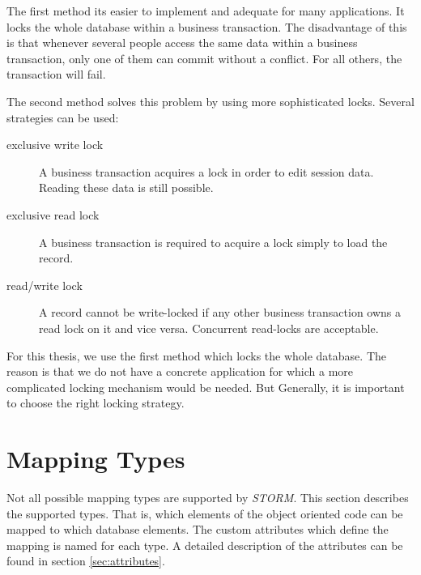 		The first method its easier to implement and adequate for many applications. It locks the
		whole database within a business transaction. The disadvantage of this is that whenever several
		people access the same data within a business transaction, only one of them can commit without 
		a conflict. For all others, the transaction will fail.
		
		The second method solves this problem by using more sophisticated locks. Several strategies
		can be used:
		
		\begin{description}
			\item[exclusive write lock] A business transaction acquires a lock in order to edit session data. Reading 
																	these data is still possible.
			\item[exclusive read lock]	A business transaction is required to acquire a lock simply to load the record.
			\item[read/write lock]			A record cannot be write-locked if any other business transaction owns a
																	read lock on it and vice versa. Concurrent read-locks are acceptable.
		\end{description} 
		
		For this thesis, we use the first method which locks the whole database. The reason is that
		we do not have a concrete application for which a more complicated locking mechanism would
		be needed. But Generally, it is important to choose the right locking strategy.

	\section{Mapping Types}
	\label{sec:mappingTypes}
		
		Not all possible mapping types are supported by \textit{STORM}. This section 
		describes the supported types. That is, which elements of the object oriented 
		code can be mapped to which database elements. The custom attributes which define
		the mapping is named for each type.
		A detailed description of the attributes can be found in section \ref{sec:attributes}.
		
